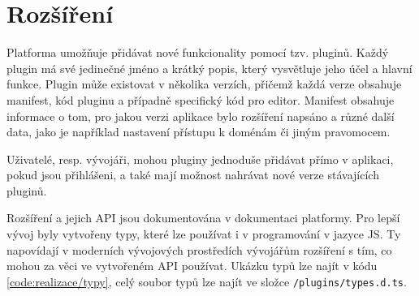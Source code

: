 



\section{Rozšíření}

Platforma umožňuje přidávat nové funkcionality pomocí tzv. pluginů. 
Každý plugin má své jedinečné jméno a krátký popis, který vysvětluje jeho účel a hlavní funkce. 
Plugin může existovat v několika verzích, přičemž každá verze obsahuje manifest, kód pluginu a případně specifický kód pro editor.
Manifest obsahuje informace o tom, pro jakou verzi aplikace bylo rozšíření napsáno a různé další data, jako je například nastavení přístupu k doménám či jiným pravomocem.

Uživatelé, resp. vývojáři, mohou pluginy jednoduše přidávat přímo v aplikaci, pokud jsou přihlášeni, a také mají možnost nahrávat nové verze stávajících pluginů. 

Rozšíření a jejich API jsou dokumentována v dokumentaci platformy.
Pro lepší vývoj byly vytvořeny typy, které lze používat i v programování v jazyce JS.
Ty napovídají v moderních vývojových prostředích vývojářům rozšíření s tím, co mohou za věci ve vytvořeném API používat.
Ukázku typů lze najít v kódu \ref{code:realizace/typy}, celý soubor typů lze najít ve složce \verb|/plugins/types.d.ts|.


